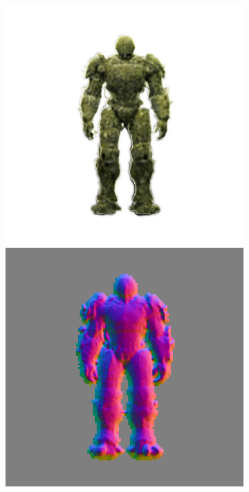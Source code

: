 \begin{figure}[H]
\begin{subfigure}[b]{0.18\textwidth}
        \caption{}
    \end{subfigure}
    \begin{subfigure}[b]{0.18\textwidth}
        \centering
        \fontsize{9pt}{7pt}\selectfont{}
        \includegraphics[width=\textwidth]{figures/generationProcess/wonder3D_3000_front_part2}
        \includegraphics[width=\textwidth]{figures/generationProcess/wonder3D_3000_front_part4}

\end{subfigure}
\end{figure}
